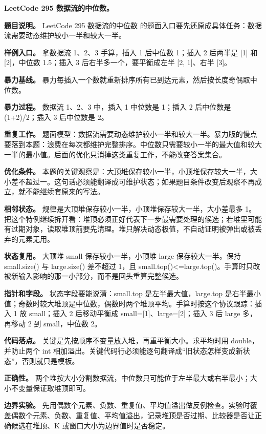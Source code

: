 \noindent\textbf{LeetCode 295 数据流的中位数。}

\textbf{题目说明。} LeetCode 295 数据流的中位数 的题面入口要先还原成具体任务：数据流需要动态维护较小一半和较大一半。

\textbf{样例入口。} 拿数据流 1、2、3 手算，插入 1 后中位数 1；插入 2 后两半是 [1] 和 [2]，中位数 1.5；插入 3 后右半多一个，要平衡成左半 [2, 1]、右半 [3]。

\textbf{暴力基线。} 暴力每插入一个数就重新排序所有已到达元素，然后按长度奇偶取中位数。

\textbf{暴力过程。} 数据流 1、2、3 中，插入 1 中位数是 1；插入 2 后中位数是 (1+2)/2；插入 3 后中位数是 2。

\textbf{重复工作。} 题面模型：数据流需要动态维护较小一半和较大一半。暴力版的慢点要落到本题：浪费在每次都维护完整排序。中位数只需要较小一半的最大值和较大一半的最小值。后面的优化只消掉这类重复工作，不能改变答案集合。

\textbf{优化条件。} 本题的关键观察是：大顶堆保存较小一半，小顶堆保存较大一半，大小差不超过一。这句话必须能翻译成可维护状态；如果题目条件改变后观察不再成立，就不能继续套原来的写法。

\textbf{相邻状态。} 规律是大顶堆保存较小一半，小顶堆保存较大一半，大小差最多 1。把这个特例继续拆开看：堆顶必须正好代表下一步最需要处理的候选；若堆里可能有过期对象，读取堆顶前要先清理。堆只解决动态极值，不自动证明被弹出或被丢弃的元素无用。

\textbf{状态复用。} 大顶堆 small 保存较小一半，小顶堆 large 保存较大一半。保持 small.size() 与 large.size() 差不超过 1，且 small.top()<=large.top()。手算时只改被新输入影响的那一小部分，而不是回头重算完整候选。

\textbf{指针和字段。} 状态字段要能说清：small.top 是左半最大值，large.top 是右半最小值；奇数时较大堆顶是中位数，偶数时两个堆顶平均。手算时按这个协议跟踪：插入 1 放 small；插入 2 后移动平衡成 small=[1]、large=[2]；插入 3 后 large 多，再移动 2 到 small，中位数 2。

\textbf{代码落点。} 关键是先按顺序不变量放入堆，再重平衡大小。求平均时用 double，并防止两个 int 相加溢出。关键代码行必须能逐句翻译成“旧状态怎样变成新状态”，否则就只是模板。

\textbf{正确性。} 两个堆按大小分割数据流，中位数只可能位于左半最大或右半最小；大小不变量保证取堆顶即可。

\textbf{边界实验。} 先用偶数个元素、负数、重复值、平均值溢出做反例检查。实验时覆盖偶数个元素、负数、重复值、平均值溢出，记录堆顶是否过期、比较器是否让正确候选在堆顶、K 或窗口大小为边界值时是否稳定。

